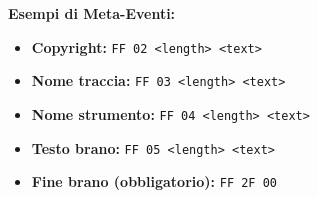 \textbf{Esempi di Meta-Eventi:}
\begin{itemize}
    \item \textbf{Copyright:} \texttt{FF 02 <length> <text>}
    \item \textbf{Nome traccia:} \texttt{FF 03 <length> <text>}
    \item \textbf{Nome strumento:} \texttt{FF 04 <length> <text>}
    \item \textbf{Testo brano:} \texttt{FF 05 <length> <text>}
    \item \textbf{Fine brano (obbligatorio):} \texttt{FF 2F 00}
\end{itemize}


